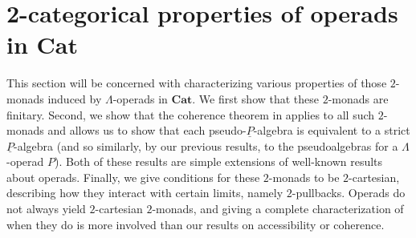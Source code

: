 \documentclass{amsbook} %
\newcommand{\mb}{\mathbf}
\numberwithin{section}{chapter}
\begin{document}


\section{2-categorical properties of operads in \texorpdfstring{$\mb{Cat}$}{\textbf{Cat}}}\label{sec:propofopsincat}

This section will be concerned with characterizing various properties of those $2$-monads induced by $\Lambda$-operads in $\mb{Cat}$. We first show that these $2$-monads are finitary.  Second, we show that the coherence theorem in \cite{lack-cod} applies to all such $2$-monads and allows us to show that each pseudo-$\underline{P}$-algebra is equivalent to a strict $\underline{P}$-algebra (and so similarly, by our previous results, to the pseudoalgebras for a $\Lambda$-operad $P$).  Both of these results are simple extensions of well-known results about operads.  Finally, we give conditions for these $2$-monads to be $2$-cartesian, describing how they interact with certain limits, namely $2$-pullbacks. Operads do not always yield $2$-cartesian $2$-monads, and giving a complete characterization of when they do is more involved than our results on accessibility or coherence.
\end{document}
